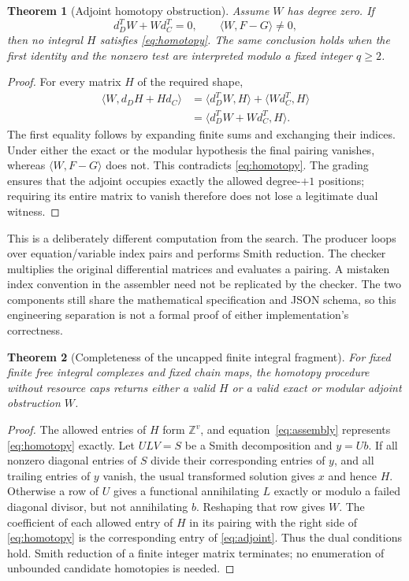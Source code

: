 \documentclass[11pt,letterpaper]{article}
\newtheorem{theorem}{Theorem}[section]
\theoremstyle{definition}\newtheorem{definition}[theorem]{Definition}
\theoremstyle{remark}\newtheorem{remark}[theorem]{Remark}
\newcommand{\Z}{\mathbb Z}\newcommand{\Q}{\mathbb Q}
\newcommand{\pair}[2]{\langle #1,#2\rangle}
\begin{document}
\begin{theorem}[Adjoint homotopy obstruction]\label{thm:dual}
Assume $W$ has degree zero. If
\[
 d_D^TW+Wd_C^T=0,\qquad \pair{W}{F-G}\ne0,
\]
then no integral $H$ satisfies \eqref{eq:homotopy}. The same conclusion holds
when the first identity and the nonzero test are interpreted modulo a fixed
integer $q\geq2$.
\end{theorem}
\begin{proof}
For every matrix $H$ of the required shape,
\begin{align*}
 \pair{W}{d_DH+Hd_C}
 &=\pair{d_D^TW}{H}+\pair{Wd_C^T}{H}\\
 &=\pair{d_D^TW+Wd_C^T}{H}.
\end{align*}
The first equality follows by expanding finite sums and exchanging their
indices. Under either the exact or the modular hypothesis the final pairing
vanishes, whereas $\pair{W}{F-G}$ does not. This contradicts
\eqref{eq:homotopy}. The grading ensures that the adjoint occupies exactly the
allowed degree-$+1$ positions; requiring its entire matrix to vanish therefore
does not lose a legitimate dual witness.
\end{proof}

This is a deliberately different computation from the search. The producer
loops over equation/variable index pairs and performs Smith reduction.
The checker multiplies the original differential matrices and evaluates a
pairing. A mistaken index convention in the assembler need not be replicated
by the checker. The two components still share the mathematical specification
and JSON schema, so this engineering separation is not a formal proof of either
implementation's correctness.

\begin{theorem}[Completeness of the uncapped finite integral fragment]
For fixed finite free integral complexes and fixed chain maps, the homotopy
procedure without resource caps returns either a valid $H$ or a valid exact or
modular adjoint obstruction $W$.
\end{theorem}
\begin{proof}
The allowed entries of $H$ form $\Z^v$, and equation~\eqref{eq:assembly}
represents \eqref{eq:homotopy} exactly. Let $ULV=S$ be a Smith decomposition and
$y=Ub$. If all nonzero diagonal entries of $S$ divide their corresponding
entries of $y$, and all trailing entries of $y$ vanish, the usual transformed
solution gives $x$ and hence $H$.
Otherwise a row of $U$ gives a functional annihilating $L$ exactly or modulo a
failed diagonal divisor, but not annihilating $b$. Reshaping that row gives $W$.
The coefficient of each allowed entry of $H$ in its pairing with the right side
of \eqref{eq:homotopy} is the corresponding entry of
\eqref{eq:adjoint}. Thus the dual conditions hold. Smith reduction of a finite
integer matrix terminates; no enumeration of unbounded candidate homotopies is
needed.
\end{proof}
\end{document}
